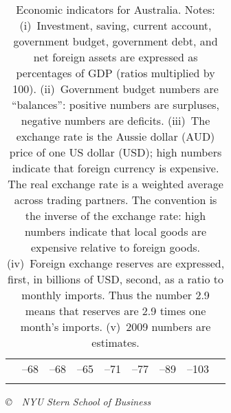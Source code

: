 \documentclass[letterpaper,12pt]{exam}
\begin{document}
\begin{table}[h]
\begin{minipage}
\begin{center}
{\begin{tabular}{lrrrrrrrr}
        & --68 & --68 & --65 & --71 & --77 & --89 & --103 \\ 
\vspace{-3mm} \\
\hline 
\end{tabular}
}
\end{center}
\end{minipage}
\caption{Economic indicators for Australia.  
Notes:  
(i)~Investment, saving, current account, government budget, 
government debt, and net foreign assets
are expressed as percentages of GDP (ratios multiplied by 100).  
(ii)~Government budget numbers are ``balances'':  positive 
numbers are surpluses, negative numbers are deficits.  
(iii)~The exchange rate is the Aussie dollar (AUD) price 
of one US dollar (USD);
high numbers indicate that foreign currency is expensive.  
The real exchange rate is a weighted average across trading partners.  
The convention is the inverse of the exchange rate:  
high numbers indicate that local goods are expensive relative to foreign 
goods.  
(iv)~Foreign exchange reserves are expressed, first, 
in billions of USD, second, 
as a ratio to monthly imports. 
Thus the number 2.9 means that reserves are 2.9 times one
month's imports.
(v)~2009 numbers are estimates.}
\label{tab:auz} 
\end{table}



\vfill \centerline{\it \copyright \ \number\year \ 
NYU Stern School of Business}
\end{document}
